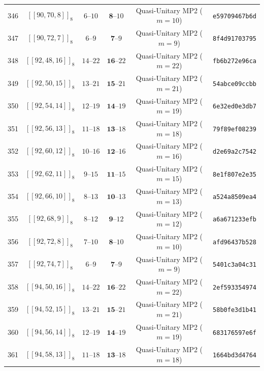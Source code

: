 \documentclass[11pt,a4paper]{article}
\theoremstyle{remark}
\begin{document}
{\begin{longtable}{@{}rccccl@{}}
346 & $[[90,70,8]]_{8}$ & $6\text{--}10$ & $\mathbf{8}\text{--}10$ & Quasi-Unitary MP2 ($m=10$) & \texttt{e59709467b6d} \\
347 & $[[90,72,7]]_{8}$ & $6\text{--}9$ & $\mathbf{7}\text{--}9$ & Quasi-Unitary MP2 ($m=9$) & \texttt{8f4d91703795} \\
348 & $[[92,48,16]]_{8}$ & $14\text{--}22$ & $\mathbf{16}\text{--}22$ & Quasi-Unitary MP2 ($m=22$) & \texttt{fb6b272e96ca} \\
349 & $[[92,50,15]]_{8}$ & $13\text{--}21$ & $\mathbf{15}\text{--}21$ & Quasi-Unitary MP2 ($m=21$) & \texttt{54abce09ccbb} \\
350 & $[[92,54,14]]_{8}$ & $12\text{--}19$ & $\mathbf{14}\text{--}19$ & Quasi-Unitary MP2 ($m=19$) & \texttt{6e32ed0e3db7} \\
351 & $[[92,56,13]]_{8}$ & $11\text{--}18$ & $\mathbf{13}\text{--}18$ & Quasi-Unitary MP2 ($m=18$) & \texttt{79f89ef08239} \\
352 & $[[92,60,12]]_{8}$ & $10\text{--}16$ & $\mathbf{12}\text{--}16$ & Quasi-Unitary MP2 ($m=16$) & \texttt{d2e69a2c7542} \\
353 & $[[92,62,11]]_{8}$ & $9\text{--}15$ & $\mathbf{11}\text{--}15$ & Quasi-Unitary MP2 ($m=15$) & \texttt{8e1f807e2e35} \\
354 & $[[92,66,10]]_{8}$ & $8\text{--}13$ & $\mathbf{10}\text{--}13$ & Quasi-Unitary MP2 ($m=13$) & \texttt{a524a8509ea4} \\
355 & $[[92,68,9]]_{8}$ & $8\text{--}12$ & $\mathbf{9}\text{--}12$ & Quasi-Unitary MP2 ($m=12$) & \texttt{a6a671233efb} \\
356 & $[[92,72,8]]_{8}$ & $7\text{--}10$ & $\mathbf{8}\text{--}10$ & Quasi-Unitary MP2 ($m=10$) & \texttt{afd96437b528} \\
357 & $[[92,74,7]]_{8}$ & $6\text{--}9$ & $\mathbf{7}\text{--}9$ & Quasi-Unitary MP2 ($m=9$) & \texttt{5401c3a04c31} \\
358 & $[[94,50,16]]_{8}$ & $14\text{--}22$ & $\mathbf{16}\text{--}22$ & Quasi-Unitary MP2 ($m=22$) & \texttt{2ef593354974} \\
359 & $[[94,52,15]]_{8}$ & $13\text{--}21$ & $\mathbf{15}\text{--}21$ & Quasi-Unitary MP2 ($m=21$) & \texttt{58b0fe3d1b41} \\
360 & $[[94,56,14]]_{8}$ & $12\text{--}19$ & $\mathbf{14}\text{--}19$ & Quasi-Unitary MP2 ($m=19$) & \texttt{683176597e6f} \\
361 & $[[94,58,13]]_{8}$ & $11\text{--}18$ & $\mathbf{13}\text{--}18$ & Quasi-Unitary MP2 ($m=18$) & \texttt{1664bd3d4764} \\

\end{longtable}}
\end{document}
